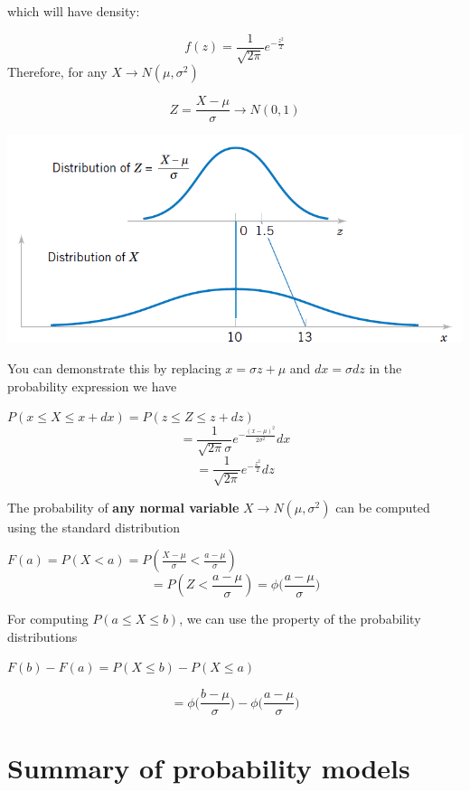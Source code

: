 \documentclass[
]{book}
\begin{document}
which will have density:

\[f(z)=\frac{1}{ \sqrt{2\pi}}e^{-\frac{z^2}{2}} \]
Therefore, for any \(X \rightarrow N(\mu, \sigma^2)\)

\[Z=\frac{X-\mu}{\sigma} \rightarrow N(0, 1) \]

\includegraphics{./figures/stand.png}

You can demonstrate this by replacing \(x=\sigma z+\mu\) and \(dx=\sigma dz\) in the probability expression we have

\(P(x\leq X \leq x +dx)=P(z\leq Z \leq z +dz)\)
\[=\frac{1}{\sqrt{2\pi}\sigma}e^{-\frac{(x-\mu)^2}{2\sigma^2}}dx\] \[=\frac{1}{ \sqrt{2\pi}}e^{-\frac{z^2}{2}} dz\]

The probability of \textbf{any normal variable} \(X\rightarrow N(\mu, \sigma^2)\) can be computed using the standard distribution

\(F(a)=P(X<a)=P(\frac{X-\mu}{\sigma}<\frac{a-\mu}{\sigma})\)
\[=P(Z < \frac{a-\mu}{\sigma})= \phi \big(\frac{a-\mu}{\sigma}\big)\]

For computing \(P(a\leq X \leq b)\), we can use the property of the probability distributions

\(F(b)-F(a)=P(X\leq b)-P(X\leq a)\)

\[=\phi \big(\frac{b-\mu}{\sigma}\big)-\phi \big(\frac{a-\mu}{\sigma}\big)\]

\hypertarget{summary-of-probability-models}{%
\section{Summary of probability models}\label{summary-of-probability-models}}
\end{document}
